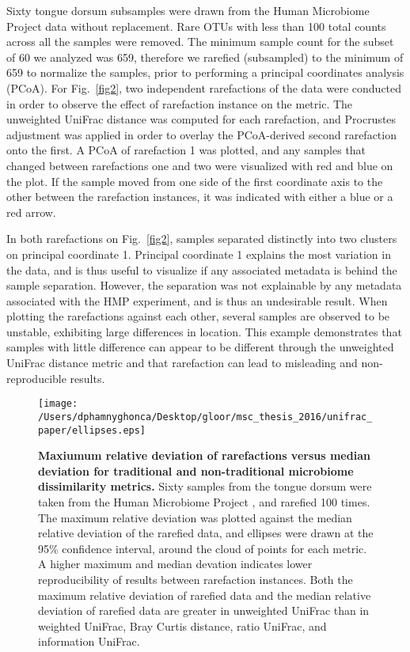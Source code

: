 \documentclass[10pt,letterpaper]{article}
\begin{document}
Sixty tongue dorsum subsamples were drawn from the Human Microbiome Project data without replacement. Rare OTUs with less than 100 total counts across all the samples were removed. The minimum sample count for the subset of 60 we analyzed was 659, therefore we rarefied (subsampled) to the minimum of 659 to normalize the samples, prior to performing a principal coordinates analysis (PCoA). For Fig.~\ref{fig2}, two independent rarefactions of the data were conducted in order to observe the effect of rarefaction instance on the metric. The unweighted UniFrac distance was computed for each rarefaction, and Procrustes adjustment was applied in order to overlay the PCoA-derived second rarefaction onto the first. A PCoA of rarefaction 1 was plotted, and any samples that changed between rarefactions one and two were visualized with red and blue on the plot. If the sample moved from one side of the first coordinate axis to the other between the rarefaction instances, it was indicated with either a blue or a red arrow. 

In both rarefactions on Fig.~\ref{fig2}, samples separated distinctly into two clusters on principal coordinate 1. Principal coordinate 1 explains the most variation in the data, and is thus useful to visualize if any associated metadata is behind the sample separation. However, the separation was not explainable by any metadata associated with the HMP experiment, and is thus an undesirable result. When plotting the rarefactions against each other, several samples are observed to be unstable, exhibiting large differences in location. This example demonstrates that samples with little difference can appear to be different through the unweighted UniFrac distance metric and that rarefaction can lead to misleading and non-reproducible results.

\begin{figure}[h]
\texttt{[image: /Users/dphamnyghonca/Desktop/gloor/msc\_thesis\_2016/unifrac\_paper/ellipses.eps]}
\caption[Maxiumum relative deviation of rarefactions versus median deviation for traditional and non-traditional microbiome dissimilarity metrics.]{{\bf Maxiumum relative deviation of rarefactions versus median deviation for traditional and non-traditional microbiome dissimilarity metrics.} Sixty samples from the tongue dorsum were taken from the Human Microbiome Project \cite{turnbaugh2007human}, and rarefied 100 times. The maximum relative deviation was plotted against the median relative deviation of the rarefied data, and ellipses were drawn at the 95\% confidence interval, around the cloud of points for each metric. A higher maximum and median devation indicates lower reproducibility of results between rarefaction instances. Both the maximum relative deviation of rarefied data and the median relative deviation of rarefied data are greater in unweighted UniFrac than in weighted UniFrac, Bray Curtis distance, ratio UniFrac, and information UniFrac.}
\label{fig3}
\end{figure}
\end{document}
